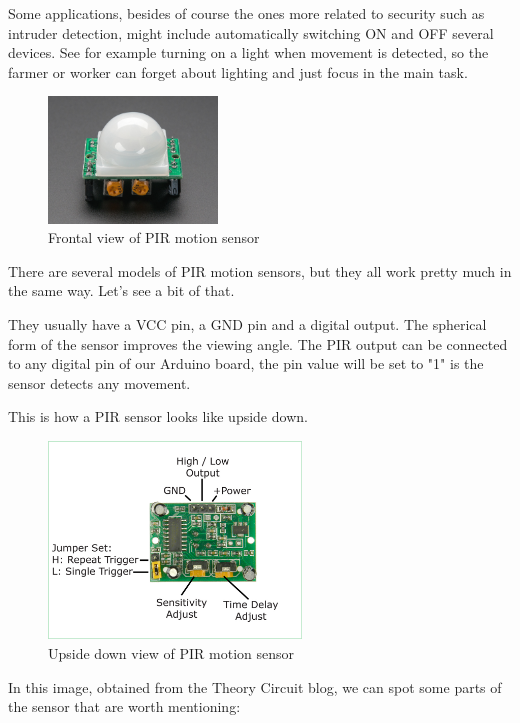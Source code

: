 Some applications, besides of course the ones more related to security such as intruder detection, might include automatically switching ON and OFF several devices. See for example turning on a light when movement is detected, so the farmer or worker can forget about lighting and just focus in the main task.

\begin{figure}[H]
    \centering
    \includegraphics[width=0.4\textwidth]{fig/pir.jpg}
    \caption{Frontal view of PIR motion sensor}
    \label{fig:pir}
\end{figure}


There are several models of PIR motion sensors, but they all work pretty much in the same way. Let's see a bit of that.

They usually have a VCC pin, a GND pin and a digital output. The spherical form of the sensor improves the viewing angle. The PIR output can be connected to any digital pin of our Arduino board, the pin value will be set to "1" is the sensor detects any movement.

This is how a PIR sensor looks like upside down.

\begin{figure}[H]
    \centering
    \includegraphics[width=0.6\textwidth]{fig/pir-upside-down.png}
    \caption{Upside down view of PIR motion sensor}
    \label{fig:pir-upsidedown}
\end{figure}

In this image, obtained from the Theory Circuit\cite{theory-circuit} blog, we can spot some parts of the sensor that are worth mentioning:

